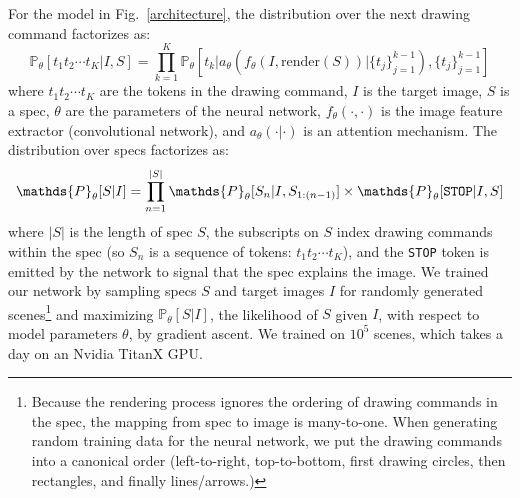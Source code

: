 \documentclass{article}
\newcommand{\probability}{\mathds{P}} %
\theoremstyle{definition}
\begin{document}
For the model in Fig.~\ref{architecture}, the distribution over the next drawing command factorizes as:
\begin{equation}
  \probability_\theta [t_1t_2\cdots t_K | I,S] = \prod_{k = 1}^K \probability_\theta \left[t_k | a_\theta \left(f_\theta(I,\text{render}(S)) | \{t_j\}_{j = 1}^{k - 1}\right), \{t_j\}_{j = 1}^{k - 1}\right]
\end{equation}
where $t_1t_2\cdots t_K$ are the tokens in the drawing command, $I$ is
the target image, $S$ is a spec, $\theta$ are the
parameters of the neural network, $f_\theta(\cdot,\cdot)$ is the
image feature extractor (convolutional network), and $a_\theta(\cdot|\cdot)$ is an attention mechanism. The distribution over
specs factorizes as:
\begin{equation}
  \probability_\theta [S|I] = \prod_{n = 1}^{|S|} \probability_\theta [S_n | I,S_{1:(n-1)}]\times\probability_\theta [\verb|STOP| | I,S]\label{objective}
\end{equation}
where $|S|$ is the length of spec $S$, the subscripts
on $S$ index drawing commands within the spec (so $S_n$ is a sequence of tokens: $t_1t_2\cdots t_K$), and the \verb|STOP|
token is emitted by the network to signal that the spec
explains the image.
We trained our network by sampling specs $S$ and target
images $I$ for randomly generated scenes\footnote{Because the rendering process ignores the ordering of drawing commands in the spec, the mapping from spec to image is many-to-one. When generating random training data for the neural network, we put the drawing commands into a canonical order (left-to-right, top-to-bottom, first drawing circles, then rectangles, and finally lines/arrows.)}
and maximizing $\probability_\theta[S|I]$,
 the likelihood of $S$ given $I$, with respect to
  model parameters $\theta$, by gradient ascent.
We trained on $10^5$ scenes, which takes a day on an Nvidia TitanX GPU.

\end{document}
